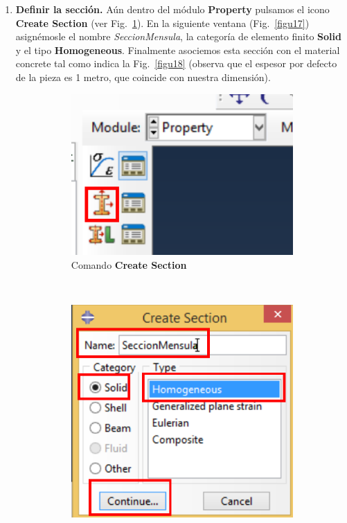 \begin{enumerate}
\item \textbf{Definir la sección.} Aún dentro del módulo
  \textbf{Property} pulsamos el icono \textbf{Create Section} (ver
  Fig.~\ref{figu16}). En la siguiente ventana (Fig.~\ref{figu17})
  asignémosle el nombre \textit{SeccionMensula}, la categoría de
  elemento finito \textbf{Solid} y el tipo \textbf{Homogeneous}.
  Finalmente asociemos esta sección con el material concrete tal como
  indica la Fig.~\ref{figu18} (observa que el espesor por defecto de
  la pieza es 1 metro, que coincide con nuestra dimensión).
  \begin{figure}[H]
    \centering
    \begin{subfigure}{0.19\textwidth}
      \includegraphics[width=\textwidth]{./body/images/imagen16.pdf}
      \caption{Comando \textbf{Create Section}}
      \label{figu16}
    \end{subfigure}%
    ~ %
    \begin{subfigure}{0.39\textwidth}
      \includegraphics[width=\textwidth]{./body/images/imagen17.pdf}

\end{subfigure}
\end{figure}
\end{enumerate}
